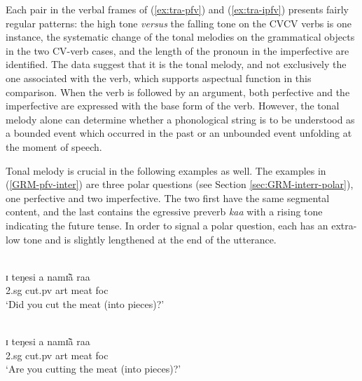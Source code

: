 \begin{exe}
\begin{exe}
\begin{exe}
{\begin{exe}
\begin{exe}
\begin{exe}
\begin{exe}
\begin{exe}
\begin{exe}
\begin{exe}
\begin{xlist}
\begin{exe}
\begin{exe}
\begin{exe}
\begin{exe}
\begin{exe}
\begin{exe}
\begin{exe}
\begin{exe}
\begin{exe}
\begin{exe}
\begin{exe}
\begin{exe}
\begin{exe}
Each pair in the verbal frames of  (\ref{ex:tra-pfv}) and (\ref{ex:tra-ipfv}) 
presents fairly regular patterns:  the high tone {\it versus} the falling tone 
on the CVCV verbs is one instance, the systematic change of the tonal melodies 
on the grammatical objects in the two CV-verb cases, and the length of the 
pronoun in the imperfective are identified. The data suggest that it is the 
tonal melody, and not exclusively the one associated with the verb, which 
supports aspectual function in this comparison. When the verb is followed by an 
argument, both perfective and the imperfective are expressed with the base form 
of the verb.  However,  the tonal melody alone  can determine whether a 
phonological string is to be understood as a bounded event which occurred in 
the 
past or an unbounded event unfolding at the moment of speech.



Tonal melody is crucial in the following examples as well. The examples in
(\ref{GRM-pfv-inter}) are three polar questions (see Section
\ref{sec:GRM-interr-polar}), one perfective  and two
imperfective. The two first have the
same segmental content, and the last contains the egressive preverb {\it kaa}
with a rising tone indicating the future tense.  In order to signal a polar
question, each has  an extra-low tone and is slightly lengthened at the end of
the utterance. 

\ea\label{GRM-pfv-inter}


\ea\label{GRM-pfv-inter-pfv}
 {\T    } {\T   } {\T    } {\T   }\\
 ɪ   teŋesi  a  namɪ̃ã  raa \\
          {\sc 2.sg} {cut.{\sc pv}} {\sc art} {meat} {\sc foc}\\
\glt `Did you cut the meat (into pieces)?'\\



\ex\label{GRM-pfv-inter-impf}

 {\T     } {\T    } {\T    } {\T   }\\
ɪ   teŋesi  a  namɪ̃ã  raa \\
          {\sc 2.sg} {cut.{\sc pv}} {\sc art} {meat} {\sc foc}\\
\glt `Are you cutting the meat (into pieces)?'\\


\ex\label{GRM-pfv-inter-impf-fut}


\end{exe}
\end{exe}
\end{exe}
\end{exe}
\end{exe}
\end{exe}
\end{exe}
\end{exe}
\end{exe}
\end{exe}
\end{exe}
\end{exe}
\end{exe}
\end{xlist}
\end{exe}
\end{exe}
\end{exe}
\end{exe}
\end{exe}
\end{exe}
\end{exe}}
\end{exe}
\end{exe}
\end{exe}
